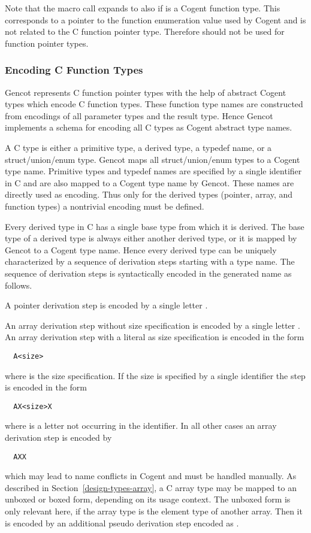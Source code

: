 Note that the macro call  expands to  also if  is a Cogent function type.
This corresponds to a pointer to the function enumeration value used by Cogent and is not related to the C
function pointer type. Therefore  should not be used for function pointer types.

\subsubsection{Encoding C Function Types}

Gencot represents C function pointer types with the help of abstract Cogent types which encode C function types. These
function type names are constructed from encodings of all parameter types and the result type. Hence Gencot implements
a schema for encoding all C types as Cogent abstract type names.

A C type is either a primitive type, a derived type, a typedef name, or a struct/union/enum type. Gencot maps all
struct/union/enum types to a Cogent type name. Primitive types and typedef names are specified by a single identifier
in C and are also mapped to a Cogent type name by Gencot. These names are directly used as encoding. Thus only for the 
derived types (pointer, array, and function types) a nontrivial encoding must be defined.

Every derived type in C has a single base type from which it is derived. The base type of a derived
type is always either another derived type, or it is mapped by Gencot to a Cogent type name. Hence every derived 
type can be uniquely characterized by a sequence of derivation steps starting with a type name. The sequence of 
derivation steps is syntactically encoded in the generated name as follows.

A pointer derivation step is encoded by a single letter . 

An array derivation step without size
specification is encoded by a single letter . An array derivation step with a literal
as size specification is encoded in the form
\begin{verbatim}
  A<size>
\end{verbatim}
where  is the size specification. If the size is specified by a single identifier the 
step is encoded in the form
\begin{verbatim}
  AX<size>X
\end{verbatim}
where  is a letter not occurring in the identifier.
In all other cases an array derivation step is encoded by
\begin{verbatim}
  AXX
\end{verbatim}
which may lead to name conflicts in Cogent and must be handled manually. As described in 
Section~\ref{design-types-array}, a C array type may be mapped to an unboxed or boxed form, depending
on its usage context. The unboxed form is only relevant here, if the array type is the element type 
of another array. Then it is encoded by an additional pseudo derivation step encoded as .

